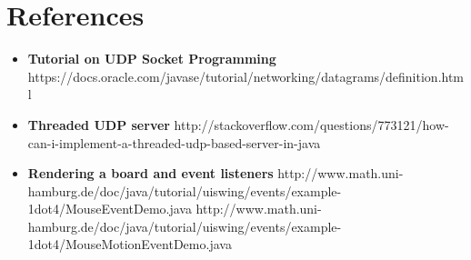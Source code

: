 \documentclass{article}
\begin{document}
\section{References}
    \begin{itemize}
        \item \textbf{Tutorial on UDP Socket Programming} 
        \newline https://docs.oracle.com/javase/tutorial/networking/datagrams/definition.html
        \item \textbf{Threaded UDP server} \newline http://stackoverflow.com/questions/773121/how-can-i-implement-a-threaded-udp-based-server-in-java
         \item \textbf{Rendering a board and event listeners} \newline http://www.math.uni-hamburg.de/doc/java/tutorial/uiswing/events/example-1dot4/MouseEventDemo.java
         \newline http://www.math.uni-hamburg.de/doc/java/tutorial/uiswing/events/example-1dot4/MouseMotionEventDemo.java
    \end{itemize}
\end{document}
